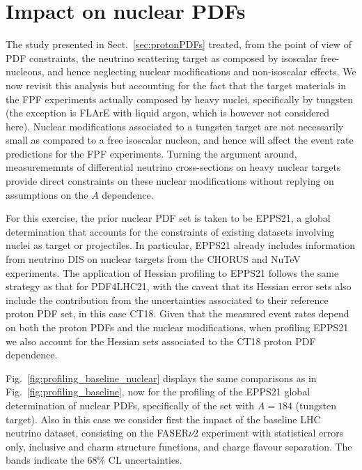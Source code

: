 \clearpage
\section{Impact on nuclear PDFs}
\label{sec:nuclearPDFs}

The study presented in Sect.~\ref{sec:protonPDFs} treated, from the point of view
of PDF constraints, the neutrino scattering target
as composed by isoscalar free-nucleons, and hence neglecting nuclear modifications
and non-isoscalar effects.
%
We now revisit this analysis but accounting for the fact that the target materials in the FPF
experiments actually
composed by heavy nuclei, specifically by tungsten (the exception is FLArE with liquid argon, which
is however not considered here).
%
Nuclear modifications associated to a tungsten target are not necessarily small as compared
to a free isoscalar nucleon, and hence will affect the event rate predictions for
the FPF experiments.
%
Turning the argument around, measurememnts of differential neutrino cross-sections
on heavy nuclear targets provide direct constraints on these nuclear modifications
without replying on assumptions on the $A$ dependence.

For this exercise, the prior nuclear PDF set is taken to be EPPS21, a global determination
that accounts for the constraints of existing datasets involving nuclei as target or projectiles.
%
In particular, EPPS21 already includes information from neutrino DIS on nuclear targets
from the CHORUS and NuTeV experiments.
%
The application of Hessian profiling to EPPS21 follows the same strategy as that
for PDF4LHC21, with the caveat that its Hessian error sets also include the contribution
from the uncertainties  associated to their reference proton PDF set, in this case CT18.
%
Given that the measured event rates depend on both the proton PDFs and the nuclear modifications,
when profiling EPPS21 we also account for the Hessian sets associated to the CT18 proton
PDF dependence.

Fig.~\ref{fig:profiling_baseline_nuclear} displays the same comparisons
as in Fig.~\ref{fig:profiling_baseline},
now for the profiling of the EPPS21 global determination of nuclear PDFs,
specifically of the set with $A=184$ (tungsten target).
%
Also in this case we consider first the impact of the baseline LHC neutrino dataset, consisting
on the FASER$\nu$2 experiment
with statistical errors only, inclusive and charm structure functions,  and charge flavour
separation.
%
The bands indicate the 68\% CL uncertainties.

